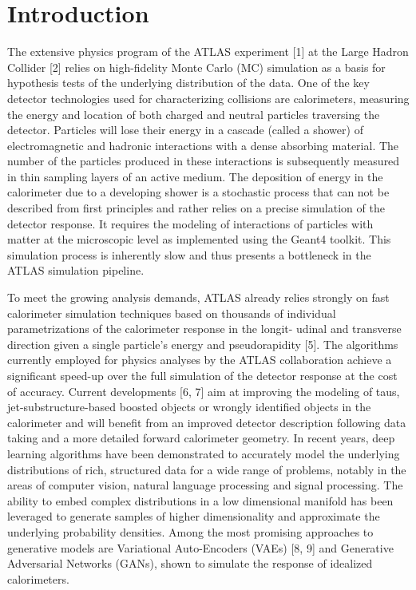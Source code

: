 %
%
%

\chapter{Introduction}\label{chap:introduction}
\enlargethispage{2ex}
\vspace*{-2pt}

The extensive physics program of the ATLAS experiment [1] at the Large Hadron Collider [2] relies on high-fidelity Monte Carlo (MC) simulation as a basis for hypothesis tests of the underlying distribution of the data. One of the key detector technologies used for characterizing collisions are calorimeters, measuring the energy and location of both charged and neutral particles traversing the detector. Particles will lose their energy in a cascade (called a shower) of electromagnetic and hadronic interactions with a dense absorbing material. The number of the particles produced in these interactions is subsequently measured in thin sampling layers of an active medium.
The deposition of energy in the calorimeter due to a developing shower is a stochastic process that can not be described from first principles and rather relies on a precise simulation of the detector response. It requires the modeling of interactions of particles with matter at the microscopic level as implemented using the Geant4 toolkit. This simulation process is inherently slow and thus presents a bottleneck in the ATLAS simulation pipeline.

To meet the growing analysis demands, ATLAS already relies strongly on fast calorimeter simulation techniques based on thousands of individual parametrizations of the calorimeter response in the longit- udinal and transverse direction given a single particle’s energy and pseudorapidity [5]. The algorithms currently employed for physics analyses by the ATLAS collaboration achieve a significant speed-up over the full simulation of the detector response at the cost of accuracy. Current developments [6, 7] aim at improving the modeling of taus, jet-substructure-based boosted objects or wrongly identified objects in the calorimeter and will benefit from an improved detector description following data taking and a more detailed forward calorimeter geometry.
In recent years, deep learning algorithms have been demonstrated to accurately model the underlying distributions of rich, structured data for a wide range of problems, notably in the areas of computer vision, natural language processing and signal processing. The ability to embed complex distributions in a low dimensional manifold has been leveraged to generate samples of higher dimensionality and approximate the underlying probability densities. Among the most promising approaches to generative models are Variational Auto-Encoders (VAEs) [8, 9] and Generative Adversarial Networks (GANs), shown to simulate the response of idealized calorimeters.

